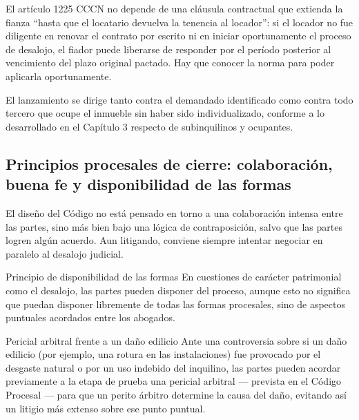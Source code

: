 \documentclass[12pt,oneside]{book}
\begin{document}
\begin{important}
El artículo 1225 CCCN no depende de una cláusula contractual que extienda la fianza ``hasta que el locatario devuelva la tenencia al locador'': si el locador no fue diligente en renovar el contrato por escrito ni en iniciar oportunamente el proceso de desalojo, el fiador puede liberarse de responder por el período posterior al vencimiento del plazo original pactado. Hay que conocer la norma para poder aplicarla oportunamente.
\end{important}


El lanzamiento se dirige tanto contra el demandado identificado como contra todo tercero que ocupe el inmueble sin haber sido individualizado, conforme a lo desarrollado en el Capítulo 3 respecto de subinquilinos y ocupantes.

\subsection*{Principios procesales de cierre: colaboración, buena fe y disponibilidad de las formas}

El diseño del Código no está pensado en torno a una colaboración intensa entre las partes, sino más bien bajo una lógica de contraposición, salvo que las partes logren algún acuerdo. Aun litigando, conviene siempre intentar negociar en paralelo al desalojo judicial.

\begin{definition}{Principio de disponibilidad de las formas}
En cuestiones de carácter patrimonial como el desalojo, las partes pueden disponer del proceso, aunque esto no significa que puedan disponer libremente de todas las formas procesales, sino de aspectos puntuales acordados entre los abogados.
\end{definition}

\begin{example}{Pericial arbitral frente a un daño edilicio}
Ante una controversia sobre si un daño edilicio (por ejemplo, una rotura en las instalaciones) fue provocado por el desgaste natural o por un uso indebido del inquilino, las partes pueden acordar previamente a la etapa de prueba una pericial arbitral --- prevista en el Código Procesal --- para que un perito árbitro determine la causa del daño, evitando así un litigio más extenso sobre ese punto puntual.
\end{example}
\end{document}
